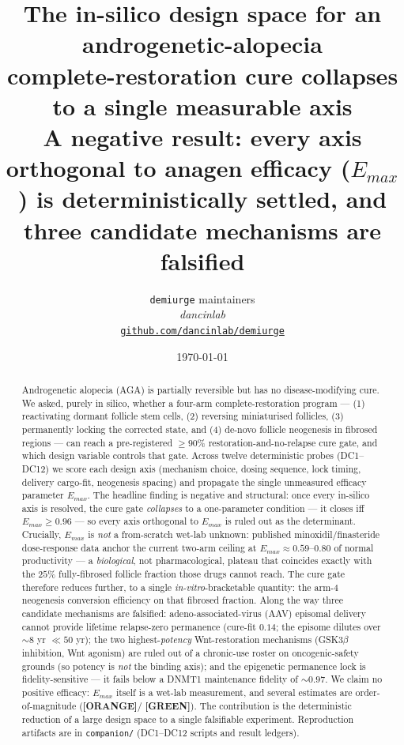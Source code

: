 \documentclass[11pt,a4paper]{article}
\title{
  \textbf{The in-silico design space for an androgenetic-alopecia\\
  complete-restoration cure collapses to a single measurable axis}\\[4pt]
  \large A negative result: every axis orthogonal to anagen efficacy ($E_{max}$)
  is deterministically settled, and three candidate mechanisms are falsified
}
\author{
  \texttt{demiurge} maintainers\\
  \normalsize\textit{dancinlab}\\[2pt]
  \normalsize\href{https://github.com/dancinlab/demiurge}{\texttt{github.com/dancinlab/demiurge}}
}
\date{\today}
\newcommand{\tierbadge}[2]{\textcolor{#1}{\textbf{[#2]}}}
\providecommand{\tierGreen}{\tierbadge{green!45!black}{GREEN}}
\providecommand{\tierOrange}{\tierbadge{orange!80!black}{ORANGE}}
\begin{document}
\maketitle

\begin{abstract}
Androgenetic alopecia (AGA) is partially reversible but has no disease-modifying
cure. We asked, purely in silico, whether a four-arm complete-restoration program
--- (1) reactivating dormant follicle stem cells, (2) reversing miniaturised
follicles, (3) permanently locking the corrected state, and (4) de-novo follicle
neogenesis in fibrosed regions --- can reach a pre-registered $\geq 90\%$
restoration-and-no-relapse cure gate, and which design variable controls that
gate. Across twelve deterministic probes (DC1--DC12) we score each design axis
(mechanism choice, dosing sequence, lock timing, delivery cargo-fit, neogenesis
spacing) and propagate the single unmeasured efficacy parameter $E_{max}$. The
headline finding is negative and structural: once every in-silico axis is
resolved, the cure gate \emph{collapses} to a one-parameter condition --- it
closes iff $E_{max}\geq 0.96$ --- so every axis orthogonal to $E_{max}$ is ruled
out as the determinant. Crucially, $E_{max}$ is \emph{not} a from-scratch wet-lab
unknown: published minoxidil/finasteride dose-response data anchor the
current two-arm ceiling at $E_{max}\approx 0.59$--$0.80$ of normal productivity ---
a \emph{biological}, not pharmacological, plateau that coincides exactly with the
$25\%$ fully-fibrosed follicle fraction those drugs cannot reach. The cure gate
therefore reduces further, to a single \emph{in-vitro}-bracketable quantity: the
arm-4 neogenesis conversion efficiency on that fibrosed fraction. Along the way three candidate mechanisms are falsified:
adeno-associated-virus (AAV) episomal delivery cannot provide lifetime
relapse-zero permanence (cure-fit $0.14$; the episome dilutes over ${\sim}8$ yr
$\ll 50$ yr); the two highest-\emph{potency} Wnt-restoration mechanisms
(GSK3$\beta$ inhibition, Wnt agonism) are ruled out of a chronic-use roster on
oncogenic-safety grounds (so potency is \emph{not} the binding axis); and the
epigenetic permanence lock is fidelity-sensitive --- it fails below a DNMT1
maintenance fidelity of ${\sim}0.97$. We claim no positive efficacy: $E_{max}$
itself is a wet-lab measurement, and several estimates are order-of-magnitude
(\tierOrange / \tierGreen). The contribution is the deterministic reduction of a
large design space to a single falsifiable experiment. Reproduction artifacts are
in \texttt{companion/} (DC1--DC12 scripts and result ledgers).
\end{abstract}
\end{document}

